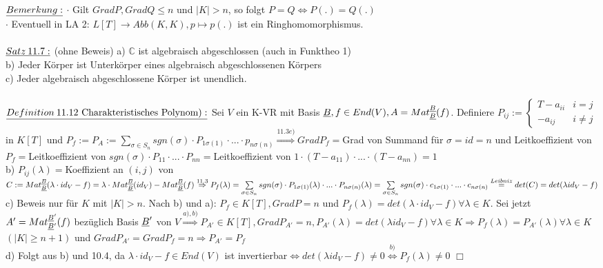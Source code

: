 \documentclass[fleqn, a4paper, 11pt]{scrartcl}
\newcommand{\CC}{\mathbb{C}}
\theoremstyle{definition}
\begin{document}
$\uline{Bemerkung:}$ $\cdot$ Gilt $Grad P,Grad Q\leq n$ und $|K|>n$, so folgt $P=Q\Leftrightarrow P(.)=Q(.)$\\
$\cdot$ Eventuell in LA 2: $L[T]\rightarrow Abb(K,K),p\mapsto p(.)$ ist ein Ringhomomorphismus.\\
\\
$\uline{Satz\:11.7:}$ (ohne Beweis) a) $\CC$ ist algebraisch abgeschlossen (auch in Funktheo 1)\\
b) Jeder Körper ist Unterkörper eines algebraisch abgeschlossenen Körpers\\
c) Jeder algebraisch abgeschlossene Körper ist unendlich.\\
\\
$\uline{Definition\:11.12\text{ Charakteristisches Polynom)}:}$ Sei $V$ ein K-VR mit Basis $\uline{B},f\in End(V),A=Mat_{\uline{B}}^{\uline{B}}(f)$. Definiere $P_{ij}:=\begin{cases}
	T-a_{ii} & i=j\\
	-a_{ij} & i\neq j
\end{cases}$ in $K[T]$ und $P_f:=P_A:=\sum\limits_{\sigma\in S_n}sgn(\sigma)\cdot P_{1\sigma(1)}\cdot...\cdot p_{n\sigma(n)}\stackrel{11.3e)}{\Rightarrow} Grad P_f=$Grad von Summand für $\sigma=id=n$ und Leitkoeffizient von $P_f=$Leitkoeffizient von $sgn(\sigma)\cdot P_{11}\cdot ...\cdot P_{nn}=$Leitkoeffizient von $1\cdot(T-a_{11})\cdot ...\cdot (T-a_{nn})=1$\\
b) $P_{ij}(\lambda)=$Koeffizient an $(i,j)$ von $C:=Mat_{\uline{B}}^{\uline{B}}(\lambda\cdot id_V -f)=\lambda\cdot Mat_{\uline{B}}^{\uline{B}}(id_V)-Mat_{\uline{B}}^{\uline{B}}(f)\stackrel{11.3}{\Rightarrow}P_f(\lambda)=\sum\limits_{\sigma\in S_n} sgn(\sigma)\cdot P_{1\sigma(1)}(\lambda)\cdot ...\cdot P_{n\sigma(n)}(\lambda)=\sum\limits_{\sigma\in S_n}sgn(\sigma)\cdot c_{1\sigma(1)}\cdot...\cdot c_{n\sigma(n)}\stackrel{Leibniz}{=}det(C)=det(\lambda id_V-f)$\\
c) Beweis nur für $K$ mit $|K|>n$. Nach b) und a): $P_f\in K[T], Grad P=n$ und $P_f(\lambda)=det(\lambda\cdot id_V-f)\forall\lambda\in K$. Sei jetzt $A'=Mat_{\uline{B}'}^{\uline{B}'}(f)$ bezüglich Basis $\uline{B}'$ von $V\stackrel{a),b)}{\Rightarrow} P_{A'}\in K[T], Grad P_{A'}=n,P_{A'}(\lambda)=det(\lambda id_V-f) \forall\lambda\in K\Rightarrow P_f(\lambda)=P_{A'}(\lambda)\forall\lambda\in K$ $(|K|\geq n+1)$ und $Grad P_{A'}=Grad P_f=n\Rightarrow P_{A'}=P_f$\\
d) Folgt aus b) und 10.4, da $\lambda\cdot id_V -f\in End(V)$ ist invertierbar$\Leftrightarrow det(\lambda id_V -f)\neq 0\stackrel{b)}{\Leftrightarrow}P_f(\lambda)\neq 0$ \hfill $\Box$\\
\end{document}
